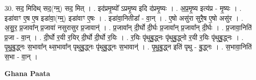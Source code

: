 \documentclass[17pt]{extarticle}
\begin{document}
30. सद॒ मिदिथ् सद॒(ग्म्॒) सद॒ मित् । . इद॑प्रमृ॒ष्यो᳚ ऽप्रमृ॒ष्य इदि द॑प्रमृ॒ष्यः । . अ॒प्र॒मृ॒ष्य इत्य॑प्र - मृ॒ष्यः । . इडा॑वाꣳ ए॒ष ए॒ष इडा॑वा॒(ग्म्॒) इडा॑वाꣳ ए॒षः । . इडा॑वा॒नितीडा᳚ - वा॒न् । . ए॒षो असु॑रा सुरै॒ष ए॒षो असु॑र । . अ॒सु॒र॒ प्र॒जावा᳚न् प्र॒जावा॑ नसुरासुर प्र॒जावान्॑ । . प्र॒जावा᳚न् दी॒र्घो दी॒र्घः प्र॒जावा᳚न् प्र॒जावा᳚न् दी॒र्घः । . प्र॒जावा॒निति॑ प्र॒जा - वा॒न् । . दी॒र्घो र॒यी र॒यिर् दी॒र्घो दी॒र्घो र॒यिः । . र॒यिः पृ॑थुबु॒द्ध्नः पृ॑थुबु॒द्ध्नो र॒यी र॒यिः पृ॑थुबु॒द्ध्नः । . पृ॒थु॒बु॒द्ध्नः स॒भावा᳚न् थ्स॒भावा᳚न् पृथुबु॒द्ध्नः पृ॑थुबु॒द्ध्नः स॒भावान्॑ । . पृ॒थु॒बु॒द्ध्न इति॑ पृथु - बु॒द्ध्नः । . स॒भावा॒निति॑ स॒भा - वा॒न् । \newline

\textbf{Ghana Paata } \newline
\end{document}
